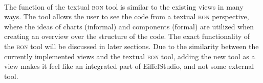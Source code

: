 \paragraph{}
The function of the textual \textsc{bon} tool is similar to the existing views in many ways. The tool allows the user to see the code from a textual \textsc{bon} perspective, where the ideas of charts (informal) and components (formal) are utilized when creating an overview over the structure of the code. The exact functionality of the \textsc{bon} tool will be discussed in later sections. Due to the similarity between the currently implemented views and the textual \textsc{bon} tool, adding the new tool as a view makes it feel like an integrated part of EiffelStudio, and not some external tool.
